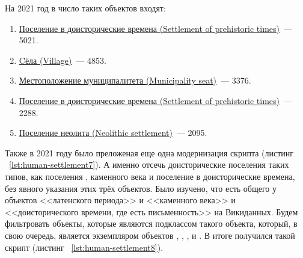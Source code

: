 На 2021 год в число таких объектов входят:
\begin{enumerate} 
  \item \href{http://www.wikidata.org/entity/Q106505070}{Поселение в доисторические времена (Settlement of prehistoric times)}~--- \num{5021}.
  \item \href{http://www.wikidata.org/entity/Q532}{Cёла (Village)}~--- \num{4853}.
  \item \href{http://www.wikidata.org/entity/Q15303838}{Местоположение муниципалитета (Municipality seat)}~--- \num{3376}.
  \item \href{http://www.wikidata.org/entity/Q106492558}{Поселение в доисторические времена (Settlement of prehistoric times)}~--- \num{2288}.
  \item \href{http://www.wikidata.org/entity/Q106491339}{Поселение неолита (Neolithic settlement)}~--- \num{2095}.
\end{enumerate}

Также в 2021 году было преложеная еще одна модернизация скрипта (листинг ~\protect\ref{lst:human-settlement7}). А именно отсечь доисторические поселения таких типов, как поселения , каменного века и  поселение в доисторические времена, без явного указания этих трёх объектов. 
Было изучено, что есть общего у объектов <<латенского периода>> и <<каменного века>> и <<доисторического времени, где есть письменность>> на Викиданных. Будем фильтровать объекты, которые являются подклассом такого объекта, который, в свою очередь, является экземпляром объектов , , ,  и . В итоге получился такой скрипт (листинг ~\protect\ref{lst:human-settlement8}).


